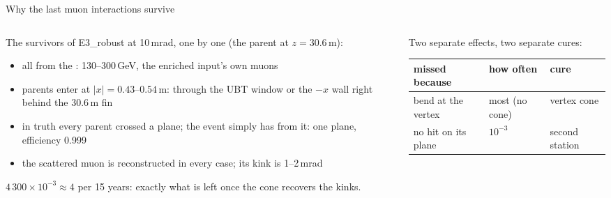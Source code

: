\begin{frame}{Why the last muon interactions survive}
  \begin{columns}[c]
    \begin{column}{0.5\textwidth}\footnotesize
      The survivors of E3\_robust at 10\,mrad, one by one (the parent at $z = 30.6$\,m):\\[1mm]
      \begin{itemize}\scriptsize
        \item all from the : 130--300\,GeV, the enriched input's own muons
        \item parents enter at $|x| = 0.43$--$0.54$\,m: through the UBT window or the $-x$ wall right behind the 30.6\,m fin
        \item in truth every parent crossed a plane; the event simply has  from it: one plane, efficiency 0.999
        \item the scattered muon is reconstructed in every case; its kink is 1--2\,mrad
      \end{itemize}
      \vspace{1mm}
      $4\,300 \times 10^{-3} \approx 4$ per 15 years: exactly what is left once the cone recovers the kinks.
    \end{column}
    \begin{column}{0.46\textwidth}\footnotesize
      Two separate effects, two separate cures:\\[1mm]
      {\scriptsize\begin{tabular}{@{}lll@{}}
        \toprule
        missed because & how often & cure\\
        \midrule
        bend at the vertex & most (no cone) & vertex cone\\
        no hit on its plane & $10^{-3}$ & second station\\
        \bottomrule
      \end{tabular}}\\[2mm]
    \end{column}
  \end{columns}
\end{frame}

